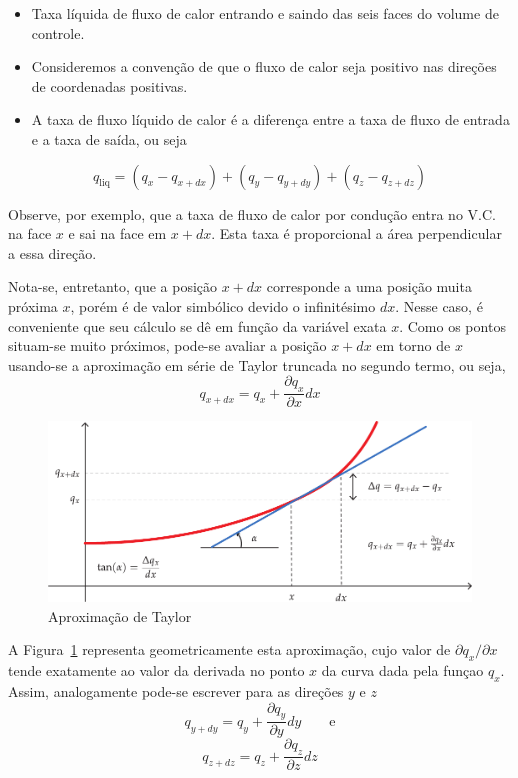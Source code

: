 \begin{itemize}
	\item Taxa líquida de fluxo de calor entrando e saindo das seis faces do volume de controle.
	\item Consideremos  a convenção de que o fluxo de calor seja positivo nas direções de coordenadas positivas.
	\item A taxa de fluxo líquido de calor é a diferença entre a taxa de fluxo de entrada e a taxa de saída, ou seja
\end{itemize}
\begin{equation}\label{eq:qliq}	 
	q_{\text{liq}} = (q_x - q_{x + dx}) + (q_y - q_{y + dy}) + (q_z - q_{z + dz})
\end{equation}

Observe, por exemplo, que a taxa de fluxo de calor por condução entra no V.C. na face $x$ e sai na face em $x + dx$. Esta taxa é proporcional a área perpendicular a essa direção.  

Nota-se, entretanto, que a posição $x + dx$ corresponde a uma posição muita próxima $x$, porém é de valor simbólico devido o infinitésimo $dx$. Nesse caso, é conveniente que seu cálculo se dê em função da variável exata $x$. Como os pontos situam-se muito próximos, pode-se avaliar a posição $x + dx$ em torno de $x$ usando-se a aproximação em série de Taylor truncada no segundo termo, ou seja, 
\begin{equation}\label{eq:dif1}
	q_{x + dx} = q_x + \frac{\partial q_x}{\partial x} dx 
\end{equation}
\begin{figure}[!ht]
	\centering
	\includegraphics[scale=0.9]{figuras/cap1/aproximacaoTaylor.pdf}
	\caption{Aproximação de Taylor}
	\label{fig:Taylor}
\end{figure} 
A Figura~\ref{fig:Taylor} representa geometricamente esta aproximação, cujo valor de $\partial q_x /\partial x$ tende exatamente ao valor da derivada no ponto $x$ da curva dada pela funçao $q_x$. Assim, analogamente pode-se escrever para as direções $y$ e $z$
\begin{equation}\label{eq:dif2}
	q_{y + dy} = q_y + \frac{\partial q_y}{\partial y} dy  \qquad \text{e}
\end{equation}
\begin{equation}\label{eq:dif3}	
	q_{z + dz} = q_z + \frac{\partial q_z}{\partial z} dz 
\end{equation}

